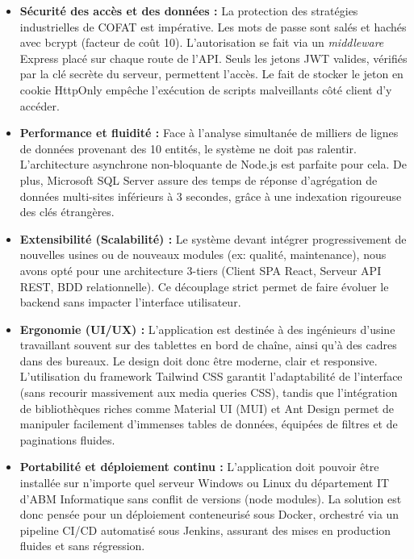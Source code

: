 \begin{itemize}
    \item \textbf{Sécurité des accès et des données :} La protection des stratégies industrielles de COFAT est impérative. Les mots de passe sont salés et hachés avec bcrypt (facteur de coût 10). L'autorisation se fait via un \textit{middleware} Express placé sur chaque route de l'API. Seuls les jetons JWT valides, vérifiés par la clé secrète du serveur, permettent l'accès. Le fait de stocker le jeton en cookie HttpOnly empêche l'exécution de scripts malveillants côté client d'y accéder.
    
    \item \textbf{Performance et fluidité :} Face à l'analyse simultanée de milliers de lignes de données provenant des 10 entités, le système ne doit pas ralentir. L'architecture asynchrone non-bloquante de Node.js est parfaite pour cela. De plus, Microsoft SQL Server assure des temps de réponse d'agrégation de données multi-sites inférieurs à 3 secondes, grâce à une indexation rigoureuse des clés étrangères.
    
    \item \textbf{Extensibilité (Scalabilité) :} Le système devant intégrer progressivement de nouvelles usines ou de nouveaux modules (ex: qualité, maintenance), nous avons opté pour une architecture 3-tiers (Client SPA React, Serveur API REST, BDD relationnelle). Ce découplage strict permet de faire évoluer le backend sans impacter l'interface utilisateur.
    
    \item \textbf{Ergonomie (UI/UX) :} L'application est destinée à des ingénieurs d'usine travaillant souvent sur des tablettes en bord de chaîne, ainsi qu'à des cadres dans des bureaux. Le design doit donc être moderne, clair et responsive. L'utilisation du framework Tailwind CSS garantit l'adaptabilité de l'interface (sans recourir massivement aux media queries CSS), tandis que l'intégration de bibliothèques riches comme Material UI (MUI) et Ant Design permet de manipuler facilement d'immenses tables de données, équipées de filtres et de paginations fluides.
    
    \item \textbf{Portabilité et déploiement continu :} L'application doit pouvoir être installée sur n'importe quel serveur Windows ou Linux du département IT d'ABM Informatique sans conflit de versions (node modules). La solution est donc pensée pour un déploiement conteneurisé sous Docker, orchestré via un pipeline CI/CD automatisé sous Jenkins, assurant des mises en production fluides et sans régression.
\end{itemize}

